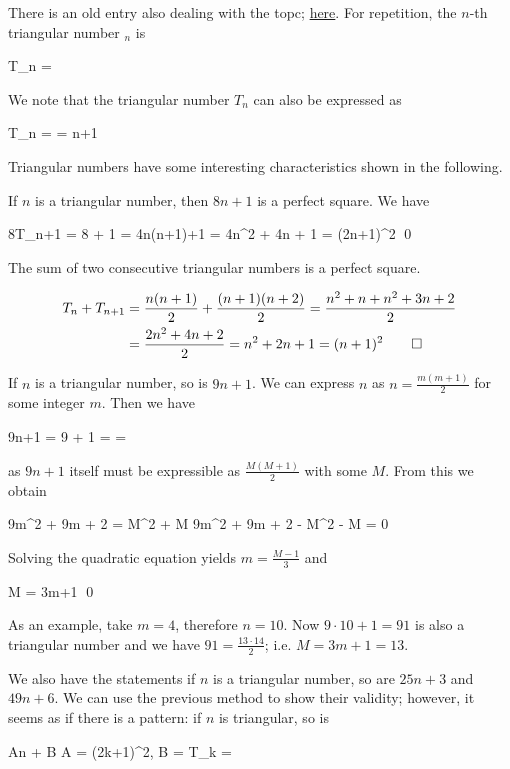 
There is an old entry also dealing with the topc; \href{2015-10-08:entry}{here}. For repetition, the $n$-th triangular number $_n$ is

\bee
T_n = 
\eee

We note that the triangular number $T_n$ can also be expressed as

\bee
T_n =  = {n+1 }
\eee

Triangular numbers have some interesting characteristics shown in the following.

If $n$ is a triangular number, then $8n+1$ is a perfect square. We have

\bee
8T_n+1 = 8  + 1 = 4n(n+1)+1 = 4n^2 + 4n + 1 = (2n+1)^2 \qed
\eee

The sum of two consecutive triangular numbers is a perfect square.

\begin{align*}
T_n + T_{n+1} &= \frac{n(n+1)}{2} + \frac{(n+1)(n+2)}{2} = \frac{n^2 + n + n^2 + 3n + 2}{2} \\ &= \frac{2n^2 + 4n + 2}{2} = n^2 + 2n +1 = (n+1)^2 \qed
\end{align*}

If $n$ is a triangular number, so is $9n+1$. We can express $n$ as $n = \frac{m(m+1)}{2}$ for some integer $m$. Then we have

\bee
9n+1 = 9  + 1 =  = 
\eee

as $9n+1$ itself must be expressible as $\frac{M(M+1)}{2}$ with some $M$. From this we obtain

\bee
9m^2 + 9m + 2 = M^2 + M \rightarrow 9m^2 + 9m + 2 - M^2 - M = 0
\eee

Solving the quadratic equation yields $m = \frac{M-1}{3}$ and

\bee
M = 3m+1 \qed
\eee

As an example, take $m=4$, therefore $n = 10$. Now $9\cdot 10+1 = 91$ is also a triangular number and we have $91 = \frac{13 \cdot 14}{2}$; i.e. $M = 3m+1 = 13$.

We also have the statements if $n$ is a triangular number, so are $25n+3$ and $49n+6$. We can use the previous method to show their validity; however, it seems as if there is a pattern: if $n$ is triangular, so is

\bee
An + B \quad {} \quad A = (2k+1)^2, B = T_k = 
\eee

